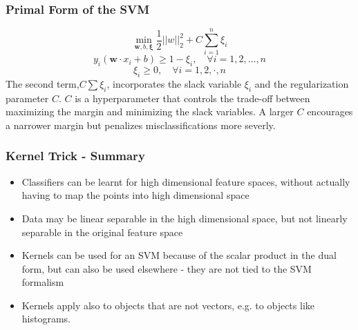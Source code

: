 \subsubsection{Primal Form of the SVM}
\[
\min_{\mathbf{w},b,\mathbf{\xi}}\frac{1}{2}||w||_2^2 + C \sum_{i = 1}^{n} \xi_i
\]
\[
y_i(\mathbf{w}\cdot x_i + b) \ge 1 - \xi_i, \quad \forall i = 1,2,\dots,n
\]
\[
\xi_i \ge 0, \quad \forall i = 1,2,\cdot,n
\]
The second term,\(C\sum \xi_i\), incorporates the slack variable \(\xi_i\) and the regularization parameter \(C\).
\(C\) is a hyperparameter that controls the trade-off between maximizing the margin and minimizing the slack variables.
A larger \(C\) encourages a narrower margin but penalizes misclassifications more severly.
\subsubsection{Kernel Trick - Summary}
\begin{itemize}
    \item Classifiers can be learnt for high dimensional feature spaces, without actually having to map the points into high dimensional space
    \item Data may be linear separable in the high dimensional space, but not linearly separable in the original feature space
    \item Kernels can be used for an SVM because of the scalar product in the dual form, but can also be used elsewhere - they are not tied to the SVM formalism
    \item Kernels apply also to objects that are not vectors, e.g. to objects like histograms.
\end{itemize}

